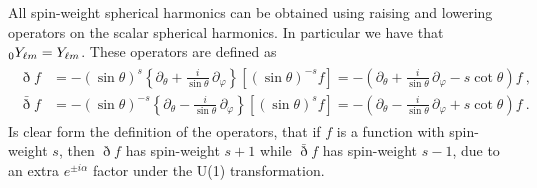 All spin-weight spherical harmonics can be obtained using raising and lowering operators on the scalar spherical harmonics. In particular we have that $\uu[0]{Y}{\ell m} = Y_{\ell m}$.
These operators are defined as
\begin{align}
	\begin{split}
		\eth f &= - (\sin{\theta})^s \left\{ \partial_\theta + \frac{i}{\sin{\theta}} \, \partial_\varphi \right\} \left[ (\sin{\theta})^{-s} f \right] 
		= - \left( \partial_\theta + \frac{i}{\sin{\theta}} \, \partial_\varphi - s \cot\theta \right) f ~, \\
		\bar{\eth} f &= - (\sin{\theta})^{-s} \left\{ \partial_\theta - \frac{i}{\sin{\theta}} \, \partial_\varphi \right\} \left[ (\sin{\theta})^{s} f \right]
		= - \left( \partial_\theta - \frac{i}{\sin{\theta}} \, \partial_\varphi + s \cot\theta \right) f ~.
	\end{split}
\end{align}
Is clear form the definition of the operators, that if $f$ is a function with spin-weight $s$, then $\eth f$ has spin-weight $s+1$ while $\bar\eth f$ has spin-weight $s-1$, due to an extra $e^{\pm i \alpha}$ factor under the U(1) transformation.

